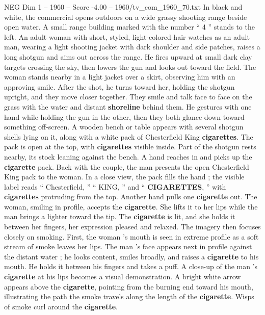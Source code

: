 \begin{textsample}{NEG Dim 1 – 1960 – Score -4.00 – 1960/tv\_com\_1960\_70.txt}  \label{ex:f1_neg_024}
In black and white, the commercial opens outdoors on a wide grassy shooting range beside open water.
A small range building marked with the number “ 4 ” stands to the left.
An adult woman with short, styled, light-colored hair watches as an adult man, wearing a light shooting jacket with dark shoulder and side patches, raises a long shotgun and aims out across the range.
He fires upward at small dark clay targets crossing the sky, then lowers the gun and looks out toward the field.
The woman stands nearby in a light jacket over a skirt, observing him with an approving smile.
After the shot, he turns toward her, holding the shotgun upright, and they move closer together.
They smile and talk face to face on the grass with the water and distant \textbf{shoreline} behind them.
He gestures with one hand while holding the gun in the other, then they both glance down toward something off-screen.
A wooden bench or table appears with several shotgun shells lying on it, along with a white pack of Chesterfield King \textbf{cigarettes}.
The pack is open at the top, with \textbf{cigarettes} visible inside.
Part of the shotgun rests nearby, its stock leaning against the bench.
A hand reaches in and picks up the \textbf{cigarette} pack.
Back with the couple, the man presents the open Chesterfield King pack to the woman.
In a close view, the pack fills the hand ; the visible label reads “ Chesterfield, ” “ KING, ” and “ \textbf{CIGARETTES}, ” with \textbf{cigarettes} protruding from the top.
Another hand pulls one \textbf{cigarette} out.
The woman, smiling in profile, accepts the \textbf{cigarette}.
She lifts it to her lips while the man brings a lighter toward the tip.
The \textbf{cigarette} is lit, and she holds it between her fingers, her expression pleased and relaxed.
The imagery then focuses closely on smoking.
First, the woman ’s mouth is seen in extreme profile as a soft stream of smoke leaves her lips.
The man ’s face appears next in profile against the distant water ; he looks content, smiles broadly, and raises a \textbf{cigarette} to his mouth.
He holds it between his fingers and takes a puff.
A close-up of the man ’s \textbf{cigarette} at his lips becomes a visual demonstration.
A bright white arrow appears above the \textbf{cigarette}, pointing from the burning end toward his mouth, illustrating the path the smoke travels along the length of the \textbf{cigarette}.
Wisps of smoke curl around the \textbf{cigarette}.

\end{textsample}
